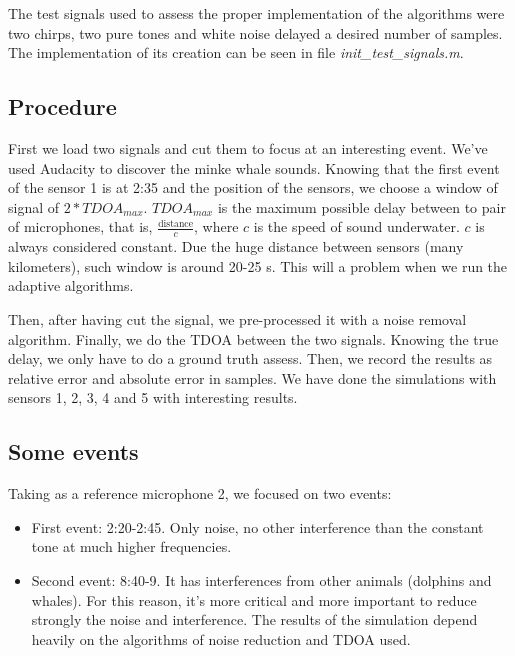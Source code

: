   The test signals used to assess the proper implementation of the algorithms were two chirps, two pure tones and white noise delayed a desired number of samples. The implementation of its creation can be seen in file \emph{init\_test\_signals.m}\cite{inittestsignals}.
  
\subsection{Procedure}
  First we load two signals and cut them to focus at an interesting event. We've used Audacity to discover the minke whale sounds. Knowing that the first event of the sensor 1 is at 2:35 and the position of the sensors, we choose a window of signal of $2*TDOA_{max}$. $TDOA_{max}$ is the maximum possible delay between to pair of microphones, that is, $\frac{\text{distance}}{c}$, where $c$ is the speed of sound underwater. $c$ is always considered constant. Due the huge distance between sensors (many kilometers), such window is around 20-25 s. This will a problem when we run the adaptive algorithms.

  Then, after having cut the signal, we pre-processed it with a noise removal algorithm. Finally, we do the TDOA between the two signals. Knowing the true delay, we only have to do a ground truth assess. Then, we record the results as relative error and absolute error in samples. We have done the simulations with sensors 1, 2, 3, 4 and 5 with interesting results.

\subsection{Some events}
  Taking as a reference microphone 2, we focused on two events:
  \begin{itemize}
    \item First event: 2:20-2:45. Only noise, no other interference than the constant tone at much higher frequencies.
    \item Second event: 8:40-9. It has interferences from other animals (dolphins and whales). For this reason, it's more critical and more important to reduce strongly the noise and interference. The results of the simulation depend heavily on the algorithms of noise reduction and TDOA used.
  \end{itemize}
